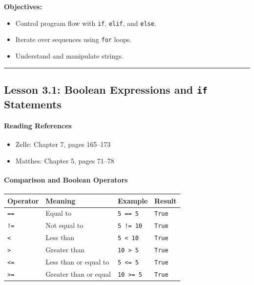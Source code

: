 \documentclass[
  justified,
  openright,
]{tufte-book}
\let\subsubsection\paragraph
\let\paragraph\paragraph
\let\subsubsection\paragraph
\let\paragraph\paragraph
\providecommand{\tightlist}{%
  \setlength{\itemsep}{0pt}\setlength{\parskip}{0pt}}
\begin{document}
\textbf{Objectives:}

\begin{itemize}
\tightlist
\item
  Control program flow with \texttt{if}, \texttt{elif}, and
  \texttt{else}.
\item
  Iterate over sequences using \texttt{for} loops.
\item
  Understand and manipulate strings.
\end{itemize}

\begin{center}\rule{0.5\linewidth}{0.5pt}\end{center}

\subsection{\texorpdfstring{Lesson 3.1: Boolean Expressions and
\texttt{if}
Statements}{Lesson 3.1: Boolean Expressions and if Statements}}\label{lesson-3.1-boolean-expressions-and-if-statements}

\subsubsection{Reading References}\label{reading-references-12}

\begin{itemize}
\tightlist
\item
  Zelle: Chapter 7, pages 165--173
\item
  Matthes: Chapter 5, pages 71--78
\end{itemize}

\subsubsection{Comparison and Boolean
Operators}\label{comparison-and-boolean-operators}

{\def\LTcaptype{none} %
\begin{longtable}[]{@{}llll@{}}
\toprule\noalign{}
Operator & Meaning & Example & Result \\
\midrule\noalign{}
\endhead
\bottomrule\noalign{}
\endlastfoot
\texttt{==} & Equal to & \texttt{5\ ==\ 5} & \texttt{True} \\
\texttt{!=} & Not equal to & \texttt{5\ !=\ 10} & \texttt{True} \\
\texttt{\textless{}} & Less than & \texttt{5\ \textless{}\ 10} &
\texttt{True} \\
\texttt{\textgreater{}} & Greater than & \texttt{10\ \textgreater{}\ 5}
& \texttt{True} \\
\texttt{\textless{}=} & Less than or equal to &
\texttt{5\ \textless{}=\ 5} & \texttt{True} \\
\texttt{\textgreater{}=} & Greater than or equal &
\texttt{10\ \textgreater{}=\ 5} & \texttt{True} \\
\end{longtable}
}
\end{document}

